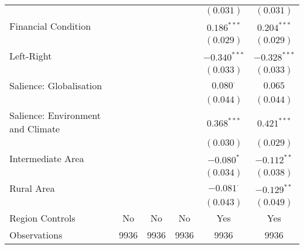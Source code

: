 \begin{center}
\begin{tiny}
\begin{longtable}{l@{} c@{} c@{} c@{} c@{} c@{}}
                                                &                &                  &                & $(0.031)$        & $(0.031)$      \\
\quad Financial Condition                       &                &                  &                & $0.186^{***}$    & $0.204^{***}$  \\
                                                &                &                  &                & $(0.029)$        & $(0.029)$      \\
\quad Left-Right                                &                &                  &                & $-0.340^{***}$   & $-0.328^{***}$ \\
                                                &                &                  &                & $(0.033)$        & $(0.033)$      \\
\quad Salience: Globalisation                   &                &                  &                & $0.080^{\cdot}$  & $0.065$        \\
                                                &                &                  &                & $(0.044)$        & $(0.044)$      \\
\quad Salience: Environment and Climate         &                &                  &                & $0.368^{***}$    & $0.421^{***}$  \\
                                                &                &                  &                & $(0.030)$        & $(0.029)$      \\
\quad Intermediate Area                         &                &                  &                & $-0.080^{*}$     & $-0.112^{**}$  \\
                                                &                &                  &                & $(0.034)$        & $(0.038)$      \\
\quad Rural Area                                &                &                  &                & $-0.081^{\cdot}$ & $-0.129^{**}$  \\
                                                &                &                  &                & $(0.043)$        & $(0.049)$      \\
\hline
Region Controls                                 & No             & No               & No             & Yes              & Yes            \\
Observations                                    & 9936           & 9936             & 9936           & 9936             & 9936           \\

\end{longtable}
\end{tiny}
\end{center}
